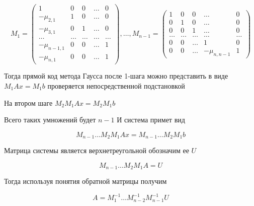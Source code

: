 \documentclass[a4paper,article,14pt]{extarticle}
\begin{document}
\begin{equation}
        M_1 = \left(
            \begin{matrix}
                1 & 0 & 0 & \dots & 0 \\
                -\mu_{2, 1} & 1 & 0 & \dots & 0 \\
                -\mu_{3, 1} & 0 & 1 & \dots & 0 \\
                \dots & \dots & \dots & \dots & \dots \\
                -\mu_{n - 1, 1} & 0 & 0 & \dots & 1 \\
                -\mu_{n, 1} & 0 & 0 & \dots & 1 
            \end{matrix}
        \right),
        \dots,
        M_{n - 1} = \left(
            \begin{matrix}
                1 & 0 & 0 & \dots & 0 \\
                0 & 1 & 0 & \dots & 0 \\
                0 & 0 & 1 & \dots & 0 \\
                \dots & \dots & \dots & \dots & \dots \\ 
                0 & 0 & \dots & 1 & 0 \\
                0 & 0 & \dots & -\mu_{n, n - 1} & 1 
            \end{matrix}
        \right)
\end{equation}

Тогда прямой код метода Гаусса после 1-шага можно представить в виде $M_1 Ax = M_1 b$ 
проверяется непосредственной подстановкой

На втором шаге $ M_2 M_1 Ax = M_2 M_1 b $

Всего таких умножений будет $ n - 1 $ 
И система примет вид

\begin{equation}
    M_{n - 1} \dots M_2 M_1 Ax = M_{n - 1} \dots M_2 M_1 b 
\end{equation}

Матрица системы является верхнетреугольной обозначим ее $U$ 

\begin{equation}
    M_{n - 1} \dots M_2 M_1 A = U
\end{equation}


Тогда используя понятия обратной матрицы получим

\begin{equation}
    A = M_{1}^{-1} \dots M_{n - 2}^{-1} M_{n - 1}^{-1}U
\end{equation}
\end{document}
